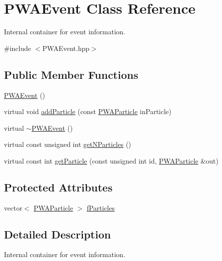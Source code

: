 \hypertarget{classPWAEvent}{
\section{PWAEvent Class Reference}
\label{dc/d66/classPWAEvent}
}


Internal container for event information.  




{\ttfamily \#include $<$PWAEvent.hpp$>$}

\subsection*{Public Member Functions}
\begin{DoxyCompactItemize}
\item 
\hyperlink{classPWAEvent_ad3c985fe0c67d2294ff58b99fb06a043}{PWAEvent} ()
\item 
virtual void \hyperlink{classPWAEvent_add408049d857264e539ea1d00b972240}{addParticle} (const \hyperlink{classPWAParticle}{PWAParticle} inParticle)
\item 
virtual \hyperlink{classPWAEvent_aab57677dff41575f0a806b42003eaff9}{$\sim$PWAEvent} ()
\item 
virtual const unsigned int \hyperlink{classPWAEvent_a49b9731f3e38c7535c14bb0df3b032fc}{getNParticles} ()
\item 
virtual const int \hyperlink{classPWAEvent_aa38bc07dfd5d8df80624d50720bffa18}{getParticle} (const unsigned int id, \hyperlink{classPWAParticle}{PWAParticle} \&out)
\end{DoxyCompactItemize}
\subsection*{Protected Attributes}
\begin{DoxyCompactItemize}
\item 
vector$<$ \hyperlink{classPWAParticle}{PWAParticle} $>$ \hyperlink{classPWAEvent_ad7b1db47d7609bbcd4e5cbffc28c2f9e}{fParticles}
\end{DoxyCompactItemize}


\subsection{Detailed Description}
Internal container for event information. 

